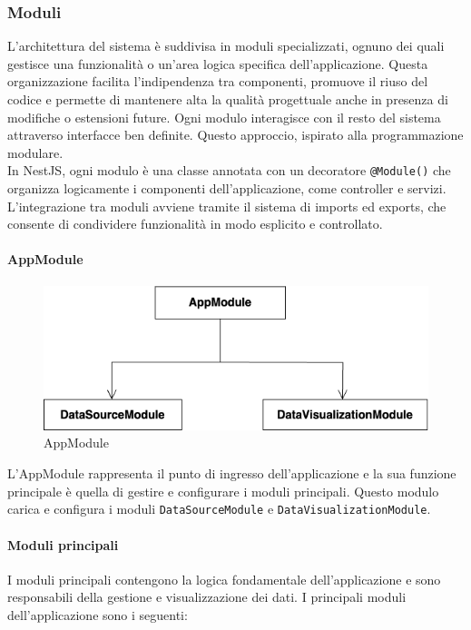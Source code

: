 \subsubsection{Moduli}

L'architettura del sistema è suddivisa in moduli specializzati, ognuno dei quali gestisce una funzionalità o un'area logica specifica dell'applicazione. Questa organizzazione facilita l’indipendenza tra componenti, promuove il riuso del codice e permette di mantenere alta la qualità progettuale anche in presenza di modifiche o estensioni future.
Ogni modulo interagisce con il resto del sistema attraverso interfacce ben definite. Questo approccio, ispirato alla programmazione modulare.\\
In NestJS, ogni modulo è una classe annotata con un decoratore \texttt{@Module()} che organizza logicamente i componenti dell’applicazione, come controller e servizi. L’integrazione tra moduli avviene tramite il sistema di imports ed exports, che consente di condividere funzionalità in modo esplicito e controllato.

\paragraph{AppModule}

\begin{figure}[H] 
    \centering
    \includegraphics[scale = 0.5]{template/images/uml_back/AppModule.png}
    \caption{AppModule}
\end{figure}

L'AppModule rappresenta il punto di ingresso dell'applicazione e la sua funzione principale è quella di gestire e configurare i moduli principali. Questo modulo carica e configura i moduli \texttt{DataSourceModule} e \texttt{DataVisualizationModule}.

\paragraph{Moduli principali}
I moduli principali contengono la logica fondamentale dell'applicazione e sono responsabili della gestione e visualizzazione dei dati. I principali moduli dell'applicazione sono i seguenti:

